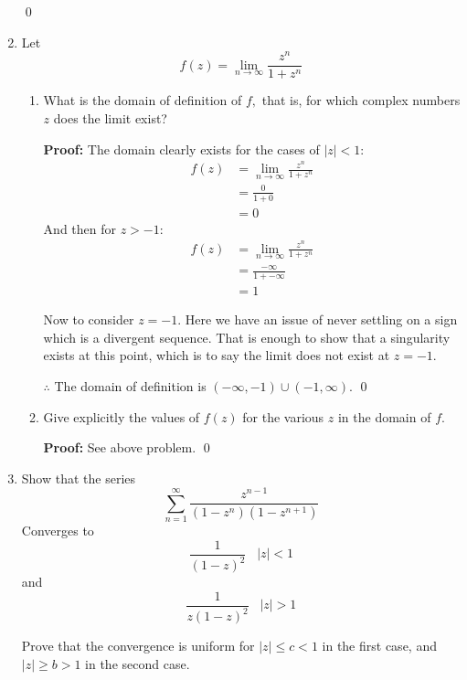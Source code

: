\begin{enumerate}
	      \qed

	\item Let \[ f(z) = \lim_{n \to \infty} \frac{z^n}{1 + z^n} \]
	      \begin{enumerate}
		      \item What is the domain of definition of $f,$ that is, for which complex numbers $z$ does the limit exist?

		            \textbf{Proof:}
		            The domain clearly exists for the cases of $|z| < 1$:
		            \begin{align*}
			            f(z) & = \lim_{n \to \infty} \frac{z^n}{1 + z^n} \\
			                 & = \frac{0}{1 + 0}                         \\
			                 & = 0
		            \end{align*}
		            And then for $z > -1$:
		            \begin{align*}
			            f(z) & = \lim_{n \to \infty} \frac{z^n}{1 + z^n} \\
			                 & = \frac{-\infty}{1 + -\infty}             \\
			                 & = 1
		            \end{align*}

		            Now to consider $z = -1$. Here we have an issue of never settling on a sign which is a divergent sequence.
		            That is enough to show that a singularity exists at this point,
		            which is to say the limit does not exist at $z = -1$.

		            $\therefore$ The domain of definition is $(-\infty, -1) \cup (-1, \infty)$.
		            \qed

		      \item Give explicitly the values of $f(z)$ for the various $z$ in the domain of $f.$

		            \textbf{Proof:}
		            See above problem. \qed

	      \end{enumerate}

	\item Show that the series
	      \[ \sum_{n = 1}^{\infty} \frac{z^{n - 1}}{(1 - z^n )(1 - z^{n + 1})} \]
	      Converges to
	      \[ \frac{1}{(1 - z)^2 } \;\;\; |z| < 1 \]
	      and
	      \[\frac{1}{z(1 - z)^2 } \;\;\; |z| > 1\]

	      Prove that the convergence is uniform for $|z| \leq c < 1$ in the first case, and $|z| \geq b > 1$ in the second case.


\end{enumerate}
